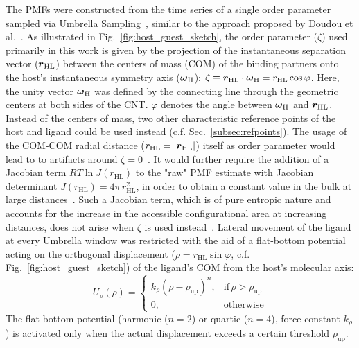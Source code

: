 \documentclass[9pt,lessons]{livecoms}
\begin{document}
The PMFs were constructed from the time series of a single order parameter sampled via Umbrella Sampling~\cite{torrie1974monte, torrie1977nonphysical}, similar to the approach proposed by Doudou et al.~\cite{doudou2009standard}.
As illustrated in Fig.~\ref{fig:host_guest_sketch}, the order parameter ($\zeta$) used primarily in this work is given by the projection of the instantaneous separation vector 
($\text{\boldmath $r$}_\mathrm{HL}$) between the centers of mass (COM) of the binding partners onto the host's instantaneous symmetry axis ($\text{\boldmath$\omega$}_\mathrm{H}$):
$\zeta \equiv \text{\boldmath $r$}_\mathrm{HL} \cdot \text{\boldmath$\omega$}_\mathrm{H} = r_\mathrm{HL} \cos{\varphi}$. 
Here, the unity vector $\text{\boldmath$\omega$}_\mathrm{H}$ was defined by the connecting line through the geometric centers at both sides of the CNT.
$\varphi$ denotes the angle between $\text{\boldmath$\omega$}_\mathrm{H}$ and $\text{\boldmath $r$}_\mathrm{HL}$.
Instead of the centers of mass, two other characteristic reference points of the host and ligand could be used instead (c.f. Sec.~\ref{subsec:refpoints}).
The usage of the COM-COM radial distance ($r_\mathrm{HL} = |\text{\boldmath $r$}_\mathrm{HL}|$) itself as order parameter would lead to to artifacts around $\zeta = 0 $~\cite{you2019potential}.
It would further require the addition of a Jacobian term  $RT \ln{J(r_\mathrm{HL})}$ to the "raw" PMF estimate with Jacobian determinant $J(r_\mathrm{HL}) = 4 \pi \, r_\mathrm{HL}^2$,  
in order to obtain a constant value in the bulk at large distances~\cite{trzesniak2007comparison}.
Such a Jacobian term, which is of pure entropic nature and accounts for the increase in the accessible configurational area at increasing distances, does not arise when $\zeta$ is used instead~\cite{doudou2009standard}.
Lateral movement of the ligand at every Umbrella window was restricted with the aid of a flat-bottom potential acting on the orthogonal displacement ($\rho = r_\mathrm{HL} \sin{\varphi}$, c.f. Fig.~\ref{fig:host_guest_sketch}) 
of the ligand's COM from the host's molecular axis:
\begin{equation}
U_\rho(\rho) = \left\{\begin{array}{ll} 
		k_\rho (\rho-\rho_\mathrm{up})^n, & \mathrm{if} \, \rho > \rho_\mathrm{up} \\
		0, & \mathrm{otherwise}
		\end{array}\right. 
\label{eq:ort_restr}
\end{equation}
The flat-bottom potential (harmonic ($n = 2$) or quartic ($n = 4$), force constant $k_\rho$) is activated only when the actual displacement exceeds a certain threshold $\rho_\mathrm{up}$.
\end{document}
